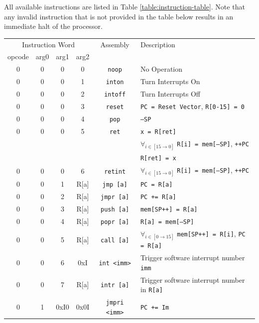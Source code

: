 \documentclass{article}
\begin{document}
All available instructions are listed in Table \ref{table:instruction-table}. Note that any invalid instruction that is not provided in the table below results in an immediate halt of the processor.

\begin{table}[h!]
	\centering
	\begin{footnotesize}
		\begin{tabular}{cccc|c|l}
			\hline
			\multicolumn{4}{c|}{Instruction Word} & Assembly & Description \\
			opcode & arg0 & arg1 & arg2 & & \\
			\hline
			0 & 0 & 0 & 0 & \texttt{noop} & No Operation \\
			0 & 0 & 0 & 1 & \texttt{inton} & Turn Interrupts On \\
			0 & 0 & 0 & 2 & \texttt{intoff} & Turn Interrupts Off \\
			0 & 0 & 0 & 3 & \texttt{reset} & \texttt{PC = Reset Vector}, \texttt{R[0-15] = 0} \\
			0 & 0 & 0 & 4 & \texttt{pop} & \texttt{--SP} \\
			0 & 0 & 0 & 5 & \texttt{ret} & \texttt{x = R[ret]} \\
			{} & {} & {} & {} & {} & $\forall_{i \in [15 \rightarrow 0]}$ \texttt{R[i] = mem[--SP]}, \texttt{++PC} \\
			{} & {} & {} & {} & {} & \texttt{R[ret] = x} \\
			0 & 0 & 0 & 6 & \texttt{retint} & $\forall_{i \in [15 \rightarrow 0]}$ \texttt{R[i] = mem[--SP]}, \texttt{++PC} \\
			0 & 0 & 1 & R[a] & \texttt{jmp [a]} & \texttt{PC = R[a]} \\
			0 & 0 & 2 & R[a] & \texttt{jmpr [a]} & \texttt{PC += R[a]} \\
			0 & 0 & 3 & R[a] & \texttt{push [a]} & \texttt{mem[SP++] = R[a]} \\
			0 & 0 & 4 & R[a] & \texttt{popr [a]} & \texttt{R[a] = mem[--SP]} \\
			0 & 0 & 5 & R[a] & \texttt{call [a]} & $\forall_{i \in [0 \rightarrow 15]}$
			 \texttt{mem[SP++] = R[i]}, \texttt{PC = R[a]} \\
 			0 & 0 & 6 & 0xI & \texttt{int <imm>} & Trigger software interrupt number \texttt{imm} \\
 			0 & 0 & 7 & R[a] & \texttt{intr [a]} & Trigger software interrupt number in \texttt{R[a]} \\
			0 & 1 & 0xI0 & 0x0I & \texttt{jmpri <imm>} & \texttt{PC += Im} \\

\end{tabular}
\end{footnotesize}
\end{table}
\end{document}

